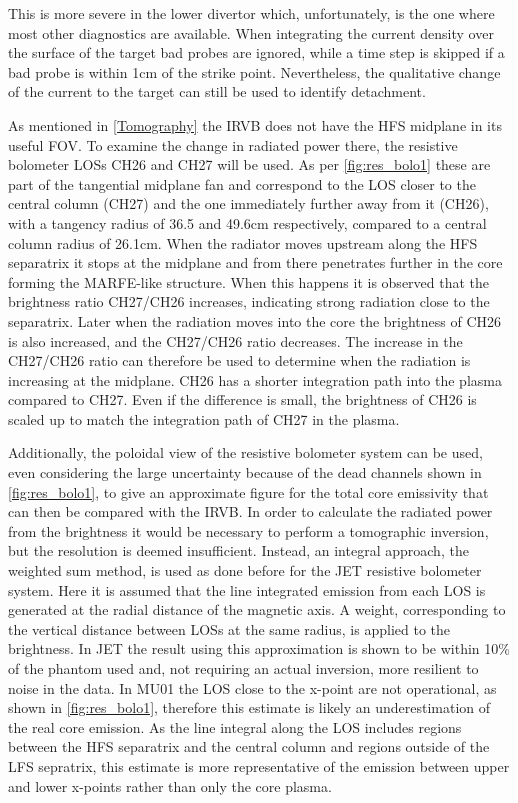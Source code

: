 This is more severe in the lower divertor which, unfortunately, is the one where most other diagnostics are available. When integrating the current density over the surface of the target bad probes are ignored, while a time step is skipped  if a bad probe is within 1cm of the strike point. Nevertheless, the qualitative change of the current to the target can still be used to identify detachment.

As mentioned in \autoref{Tomography} the IRVB does not have the HFS midplane in its useful FOV. To examine the change in radiated power there, the resistive bolometer LOSs CH26 and CH27 will be used. As per \autoref{fig:res_bolo1} these are part of the tangential midplane fan and correspond to the LOS closer to the central column (CH27) and the one immediately further away from it (CH26), with a tangency radius of 36.5 and 49.6cm respectively, compared to a central column radius of 26.1cm.
When the radiator moves upstream along the HFS separatrix it stops at the midplane and from there penetrates further in the core forming the MARFE-like structure. When this happens it is observed that the brightness ratio CH27/CH26 increases, indicating strong radiation close to the separatrix. Later when the radiation moves into the core the brightness of CH26 is also increased, and the CH27/CH26 ratio decreases. The increase in the CH27/CH26 ratio can therefore be used to determine when the radiation is increasing at the midplane. CH26 has a shorter integration path into the plasma compared to CH27. Even if the difference is small, the brightness of CH26 is scaled up to match the integration path of CH27 in the plasma.

Additionally, the poloidal view of the resistive bolometer system can be used, even considering the large uncertainty because of the dead channels shown in \autoref{fig:res_bolo1}, to give an approximate figure for the total core emissivity that can then be compared with the IRVB. In order to calculate the radiated power from the brightness it would be necessary to perform a tomographic inversion, but the resolution is deemed insufficient. Instead, an integral approach, the weighted sum method, is used as done before for the JET resistive bolometer system.\cite{Ingesson2000} Here it is assumed that the line integrated emission from each LOS is generated at the radial distance of the magnetic axis. A weight, corresponding to the vertical distance between LOSs at the same radius, is applied to the brightness. In JET the result using this approximation is shown to be within 10\% of the phantom used and, not requiring an actual inversion, more resilient to noise in the data. In MU01 the LOS close to the x-point are not operational, as shown in \autoref{fig:res_bolo1}, therefore this estimate is likely an underestimation of the real core emission. As the line integral along the LOS includes regions between the HFS separatrix and the central column and regions outside of the LFS sepratrix, this estimate is more representative of the emission between upper and lower x-points rather than only the core plasma.


